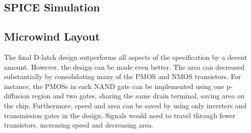 \subsection{SPICE Simulation}
\subsection{Microwind Layout}
The final D-latch design outperforms all aspects of the specification by a decent amount.
However, the design can be made even better.
The area can decreased substantially by consolidating many of the PMOS and NMOS transistors.
For instance, the PMOSs in each NAND gate can be implemented using one p-diffusion region and two gates, sharing the same drain terminal, saving area on the chip.
Furthermore, speed and area can be saved by using only inverters and transmission gates in the design.
Signals would need to travel through fewer transistors, increasing speed and decreasing area.
